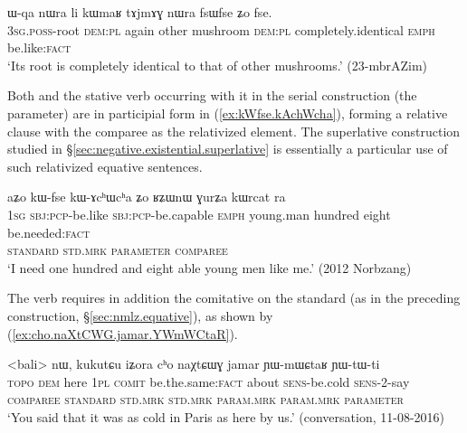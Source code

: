 \begin{exe} 
	\ex \label{ex:fsWfse.Zo.fse}
	\gll ɯ-qa nɯra li kɯmaʁ tɤjmɤɣ nɯra fsɯfse ʑo fse. \\
	\textsc{3sg}.\textsc{poss}-root \textsc{dem}:\textsc{pl} again other mushroom \textsc{dem}:\textsc{pl} completely.identical \textsc{emph} be.like:\textsc{fact} \\
	\glt `Its root is completely identical to that of other mushrooms.' (23-mbrAZim)
\end{exe}


Both  and the stative verb occurring with it in the serial construction (the parameter) are in participial form in (\ref{ex:kWfse.kAchWcha}), forming a relative clause with the comparee as the relativized element. The superlative construction studied in §\ref{sec:negative.existential.superlative} is essentially a particular use of such relativized equative sentences.

\begin{exe}
\ex \label{ex:kWfse.kAchWcha}
\glll aʑo kɯ-fse kɯ-ɤcʰɯcʰa ʑo ʁʑɯnɯ ɣurʑa kɯrcat ra\\
\textsc{1sg} \textsc{sbj}:\textsc{pcp}-be.like \textsc{sbj}:\textsc{pcp}-be.capable \textsc{emph} young.man hundred eight be.needed:\textsc{fact} \\
\textsc{standard} \textsc{std}.\textsc{mrk} \textsc{parameter} { } \textsc{comparee} \\
\glt `I need one hundred and eight able young men like me.' (2012 Norbzang)
\end{exe}

The verb  requires in addition the comitative  on the standard (as in the preceding construction, §\ref{sec:nmlz.equative}), as shown by (\ref{ex:cho.naXtCWG.jamar.YWmWCtaR}).

\begin{exe}
\ex \label{ex:cho.naXtCWG.jamar.YWmWCtaR}
\glll <bali> nɯ, kukutɕu iʑora cʰo naχtɕɯɣ jamar ɲɯ-mɯɕtaʁ ɲɯ-tɯ-ti\\
\textsc{topo} \textsc{dem} here \textsc{1pl} \textsc{comit} be.the.same:\textsc{fact} about \textsc{sens}-be.cold \textsc{sens}-2-say\\
\textsc{comparee} { }  \textsc{standard} \textsc{std}.\textsc{mrk} \textsc{std}.\textsc{mrk}  \textsc{param}.\textsc{mrk}  \textsc{param}.\textsc{mrk} \textsc{parameter}\\
\glt `You said that it was as cold in Paris as here by us.' (conversation, 11-08-2016)
\end{exe}




